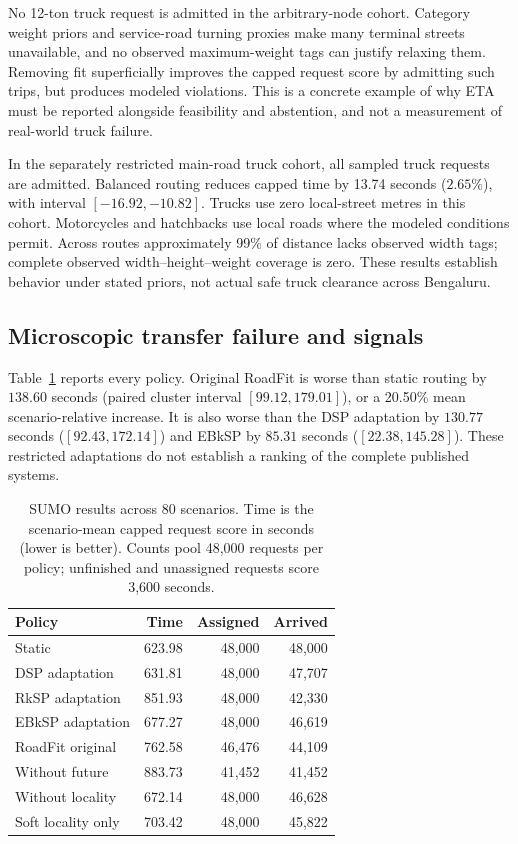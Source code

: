 \documentclass[sigconf,anonymous,review]{acmart}
\begin{document}
No 12-ton truck request is admitted in the arbitrary-node cohort. Category weight priors and service-road turning proxies make many terminal streets unavailable, and no observed maximum-weight tags can justify relaxing them. Removing fit superficially improves the capped request score by admitting such trips, but produces modeled violations. This is a concrete example of why ETA must be reported alongside feasibility and abstention, and not a measurement of real-world truck failure.

In the separately restricted main-road truck cohort, all sampled truck requests are admitted. Balanced routing reduces capped time by 13.74 seconds ($2.65\%$), with interval $[-16.92,-10.82]$. Trucks use zero local-street metres in this cohort. Motorcycles and hatchbacks use local roads where the modeled conditions permit. Across routes approximately 99\% of distance lacks observed width tags; complete observed width--height--weight coverage is zero. These results establish behavior under stated priors, not actual safe truck clearance across Bengaluru.

\subsection{Microscopic transfer failure and signals}
Table~\ref{tab:sumo} reports every policy. Original RoadFit is worse than static routing by $138.60$ seconds (paired cluster interval $[99.12,179.01]$), or a 20.50\% mean scenario-relative increase. It is also worse than the DSP adaptation by $130.77$ seconds ($[92.43,172.14]$) and EBkSP by $85.31$ seconds ($[22.38,145.28]$). These restricted adaptations do not establish a ranking of the complete published systems.

\begin{table}[t]
\caption{SUMO results across 80 scenarios. Time is the scenario-mean capped request score in seconds (lower is better). Counts pool 48,000 requests per policy; unfinished and unassigned requests score 3,600 seconds.}
\label{tab:sumo}
\centering\small
\begin{tabular}{lrrr}\toprule
Policy & Time & Assigned & Arrived\\\midrule
Static & 623.98 & 48,000 & 48,000\\
DSP adaptation & 631.81 & 48,000 & 47,707\\
RkSP adaptation & 851.93 & 48,000 & 42,330\\
EBkSP adaptation & 677.27 & 48,000 & 46,619\\
RoadFit original & 762.58 & 46,476 & 44,109\\
Without future & 883.73 & 41,452 & 41,452\\
Without locality & 672.14 & 48,000 & 46,628\\
Soft locality only & 703.42 & 48,000 & 45,822\\\bottomrule
\end{tabular}
\end{table}
\end{document}
